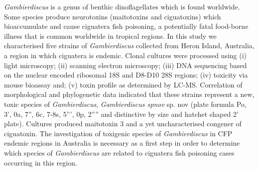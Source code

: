 \documentclass[12pt]{article}
\begin{document}
\textit{Gambierdiscus} is a genus of benthic dinoflagellates which is found worldwide. Some species produce neurotoxins (maitotoxins and ciguatoxins) which  bioaccumulate and cause ciguatera fish poisoning, a potentially fatal food-borne illness that is common worldwide in tropical regions. In this study we characterised five strains of \textit{Gambierdiscus} collected from Heron Island,  Australia, a region in which ciguatera is endemic. Clonal cultures were processed using (i) light microscopy; (ii) scanning electron microscopy; (iii) DNA sequencing based on the nuclear encoded ribosomal  18S and D8-D10 28S regions; (iv) toxicity via mouse bioassay and; (v) toxin profile as determined by LC-MS. Correlation of morphological and phylogenetic data indicated that these strains represent a new, toxic species of \emph{Gambierdiscus}, \emph{Gambierdiscus spnov} sp. nov (plate formula Po, 3', 0a, 7'', 6c, 7-8s, 5''', 0p, 2'''' and distinctive by size and hatchet shaped 2' plate). Cultures produced maitotoxin 3 and a yet uncharacterised congener of ciguatoxin. The investigation of toxigenic species of \textit{Gambierdiscus} in CFP endemic regions in Australia is necessary as a first step in order to determine which species of \textit{Gambierdiscus} are related to ciguatera fish poisoning cases occurring in this region.

\newpage
\end{document}
